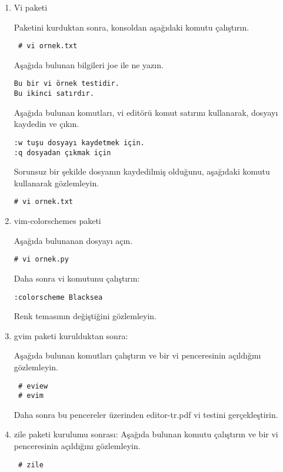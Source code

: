 \documentclass[a4paper,10pt]{article}
\begin{document}
\begin{enumerate}

\item Vi paketi

Paketini kurduktan sonra, konsoldan aşağıdaki komutu çalıştırın.

\begin{verbatim}
 # vi ornek.txt
\end{verbatim}

Aşağıda bulunan bilgileri joe ile ne yazın.
\begin{verbatim}
Bu bir vi örnek testidir.
Bu ikinci satırdır.
\end{verbatim}

Aşağıda bulunan komutları, vi editörü komut satırını kullanarak, dosyayı kaydedin ve çıkın.
\begin{verbatim}
:w tuşu dosyayı kaydetmek için.
:q dosyadan çıkmak için
\end{verbatim}

Sorunsuz bir şekilde dosyanın kaydedilmiş olduğunu, aşağıdaki komutu kullanarak gözlemleyin.
\begin{verbatim}
# vi ornek.txt 
\end{verbatim}

\item vim-colorschemes paketi

Aşağıda bulunanan dosyayı açın.
\begin{verbatim}
# vi ornek.py
\end{verbatim}

Daha sonra vi komutunu çalıştırın:
\begin{verbatim}
:colorscheme Blacksea
\end{verbatim}

Renk temasının değiştiğini gözlemleyin.


\item gvim paketi kurulduktan sonra:

Aşağıda bulunan komutları çalıştırın ve bir vi penceresinin açıldığını gözlemleyin.
\begin{verbatim}
 # eview
 # evim
\end{verbatim}

Daha sonra bu pencereler üzerinden editor-tr.pdf vi testini gerçekleştirin.

\item zile paketi kurulumu sonrası:
Aşağıda bulunan komutu çalıştırın ve bir vi penceresinin açıldığını gözlemleyin.
\begin{verbatim}
 # zile
\end{verbatim}


\end{enumerate}
\end{document}
